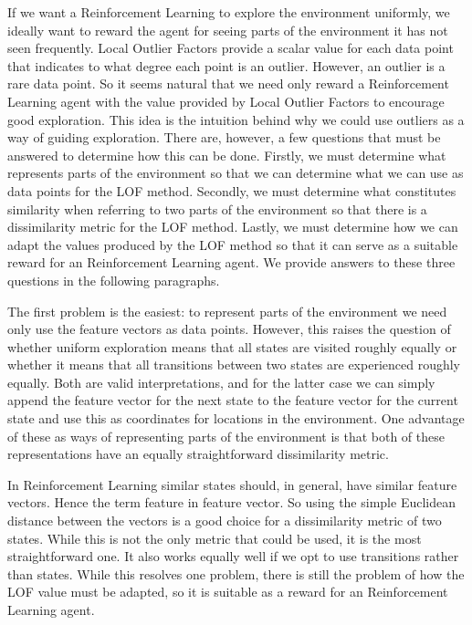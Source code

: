 \documentclass[../main.tex]{subfiles}
\begin{document}
If we want a Reinforcement Learning to explore the environment uniformly, we ideally want to reward the agent for seeing parts of the environment it has not seen frequently. Local Outlier Factors provide a scalar value for each data point that indicates to what degree each point is an outlier. However, an outlier is a rare data point. So it seems natural that we need only reward a Reinforcement Learning agent with the value provided by Local Outlier Factors to encourage good exploration. This idea is the intuition behind why we could use outliers as a way of guiding exploration.  There are, however, a few questions that must be answered to determine how this can be done. Firstly, we must determine what represents parts of the environment so that we can determine what we can use as data points for the LOF method. Secondly, we must determine what constitutes similarity when referring to two parts of the environment so that there is a dissimilarity metric for the LOF method. Lastly, we must determine how we can adapt the values produced by the LOF method so that it can serve as a suitable reward for an Reinforcement Learning agent. We provide answers to these three questions in the following paragraphs.

The first problem is the easiest: to represent parts of the environment we need only use the feature vectors as data points. However, this raises the question of whether uniform exploration means that all states are visited roughly equally or whether it means that all transitions between two states are experienced roughly equally. Both are valid interpretations, and for the latter case we can simply append the feature vector for the next state to the feature vector for the current state and use this as coordinates for locations in the environment. One advantage of these as ways of representing parts of the environment is that both of these representations have an equally straightforward dissimilarity metric.

In Reinforcement Learning similar states should, in general, have similar feature vectors. Hence the term feature in feature vector. So using the simple Euclidean distance between the vectors is a good choice for a dissimilarity metric of two states. While this is not the only metric that could be used, it is the most straightforward one. It also works equally well if we opt to use transitions rather than states. While this resolves one problem, there is still the problem of how the LOF value must be adapted, so it is suitable as a reward for an Reinforcement Learning agent.
\end{document}
